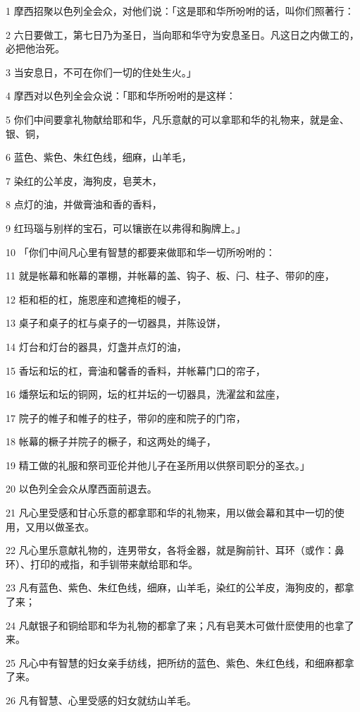 \par 1 摩西招聚以色列全会众，对他们说：「这是耶和华所吩咐的话，叫你们照著行：
\par 2 六日要做工，第七日乃为圣日，当向耶和华守为安息圣日。凡这日之内做工的，必把他治死。
\par 3 当安息日，不可在你们一切的住处生火。」
\par 4 摩西对以色列全会众说：「耶和华所吩咐的是这样：
\par 5 你们中间要拿礼物献给耶和华，凡乐意献的可以拿耶和华的礼物来，就是金、银、铜，
\par 6 蓝色、紫色、朱红色线，细麻，山羊毛，
\par 7 染红的公羊皮，海狗皮，皂荚木，
\par 8 点灯的油，并做膏油和香的香料，
\par 9 红玛瑙与别样的宝石，可以镶嵌在以弗得和胸牌上。」
\par 10 「你们中间凡心里有智慧的都要来做耶和华一切所吩咐的：
\par 11 就是帐幕和帐幕的罩棚，并帐幕的盖、钩子、板、闩、柱子、带卯的座，
\par 12 柜和柜的杠，施恩座和遮掩柜的幔子，
\par 13 桌子和桌子的杠与桌子的一切器具，并陈设饼，
\par 14 灯台和灯台的器具，灯盏并点灯的油，
\par 15 香坛和坛的杠，膏油和馨香的香料，并帐幕门口的帘子，
\par 16 燔祭坛和坛的铜网，坛的杠并坛的一切器具，洗濯盆和盆座，
\par 17 院子的帷子和帷子的柱子，带卯的座和院子的门帘，
\par 18 帐幕的橛子并院子的橛子，和这两处的绳子，
\par 19 精工做的礼服和祭司亚伦并他儿子在圣所用以供祭司职分的圣衣。」
\par 20 以色列全会众从摩西面前退去。
\par 21 凡心里受感和甘心乐意的都拿耶和华的礼物来，用以做会幕和其中一切的使用，又用以做圣衣。
\par 22 凡心里乐意献礼物的，连男带女，各将金器，就是胸前针、耳环（或作：鼻环）、打印的戒指，和手钏带来献给耶和华。
\par 23 凡有蓝色、紫色、朱红色线，细麻，山羊毛，染红的公羊皮，海狗皮的，都拿了来；
\par 24 凡献银子和铜给耶和华为礼物的都拿了来；凡有皂荚木可做什麽使用的也拿了来。
\par 25 凡心中有智慧的妇女亲手纺线，把所纺的蓝色、紫色、朱红色线，和细麻都拿了来。
\par 26 凡有智慧、心里受感的妇女就纺山羊毛。
